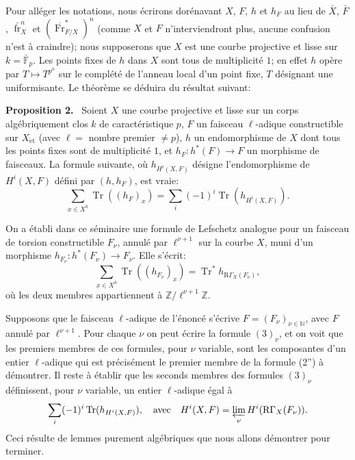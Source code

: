 \documentclass[11pt]{article}
\newenvironment{statement}[1]{\par\medskip\noindent\textbf{#1.}\ }{\par\medskip}
\newcommand{\R}{\mathrm{R}}\newcommand{\RHomCore}{\mathrm{RHom}}
\providecommand{\et}{\mathrm{\acute{e}t}}
\providecommand{\Tr}{\operatorname{Tr}}
\providecommand{\Tr}{\operatorname{Tr}}
\providecommand{\Tr}{\operatorname{Tr}}
\providecommand{\R}{\mathrm R}
\providecommand{\Tr}{\operatorname{Tr}}
\providecommand{\Tr}{\operatorname{Tr}}
\providecommand{\fr}{\operatorname{fr}}
\providecommand{\Fr}{\operatorname{Fr}}
\providecommand{\Fr}{\operatorname{Fr}}
\providecommand{\fr}{\operatorname{fr}}
\providecommand{\et}{\acute{e}t}
\begin{document}
Pour alléger les notations, nous écrirons dorénavant $X$, $F$, $h$ et $h_F$ au lieu de $\bar X$, $\bar F$, $\bar{\fr}_X^n$ et $(\overline{\Fr}^*_{F/X})^n$ (comme $X$ et $F$ n'interviendront plus, aucune confusion n'est à craindre); nous supposerons que $X$ est une courbe projective et lisse sur $k=\bar{\mathbb F}_p$. Les points fixes de $h$ dans $X$ sont tous de multiplicité $1$; en effet $h$ opère par $T\mapsto T^{p^n}$ sur le complété de l'anneau local d'un point fixe, $T$ désignant une uniformisante. Le théorème se déduira du résultat suivant:

\begin{statement}{Proposition 2}
Soient $X$ une courbe projective et lisse sur un corps algébriquement clos $k$ de caractéristique $p$, $F$ un faisceau $\ell$-adique constructible sur $X_{\et}$ (avec $\ell=$ nombre premier $\ne p$), $h$ un endomorphisme de $X$ dont tous les points fixes sont de multiplicité $1$, et $h_F:h^*(F)\to F$ un morphisme de faisceaux. La formule suivante, où $h_{H^i(X,F)}$ désigne l'endomorphisme de $H^i(X,F)$ défini par $(h,h_F)$, est vraie:
\[
\sum_{x\in X^h}\Tr((h_F)_x)=\sum_i(-1)^i\Tr(h_{H^i(X,F)}).
\tag{2''}
\]
\end{statement}

On a établi dans ce séminaire une formule de Lefschetz analogue pour un faisceau de torsion constructible $F_\nu$, annulé par $\ell^{\nu+1}$ sur la courbe $X$, muni d'un morphisme $h_{F_\nu}:h^*(F_\nu)\to F_\nu$. Elle s'écrit:
\[
\sum_{x\in X^h}\Tr((h_{F_\nu})_x)=\Tr^*h_{\R\Gamma_X(F_\nu)},
\tag{3}
\]
où les deux membres appartiennent à $\mathbb Z/\ell^{\nu+1}\mathbb Z$.

Supposons que le faisceau $\ell$-adique de l'énoncé s'écrive $F=(F_\nu)_{\nu\in\mathbb N}$, avec $F$ annulé par $\ell^{\nu+1}$. Pour chaque $\nu$ on peut écrire la formule $(3)_\nu$, et on voit que les premiers membres de ces formules, pour $\nu$ variable, sont les composantes d'un entier $\ell$-adique qui est précisément le premier membre de la formule (2'') à démontrer. Il reste à établir que les seconds membres des formules $(3)_\nu$ définissent, pour $\nu$ variable, un entier $\ell$-adique égal à
\[
\sum_i(-1)^i\Tr(h_{H^i(X,F)}),
\quad\text{avec}\quad
H^i(X,F)=\varprojlim_\nu H^i(\R\Gamma_X(F_\nu)).
\]
Ceci résulte de lemmes purement algébriques que nous allons démontrer pour terminer.
\end{document}
